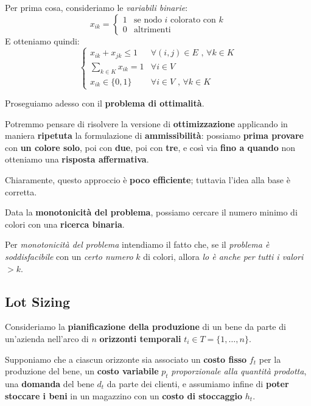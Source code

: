 Per prima cosa, consideriamo le \textit{variabili binarie}:
\[
    x_{ik} = \begin{cases}
    1 & \text{se nodo } i \text{ colorato con } k \\ 
    0 & \text{altrimenti}
    \end{cases}
\]
E otteniamo quindi:
\[
    \begin{cases}
        x_{ik} + x_{jk} \le 1 & \forall (i,j) \in E \text{ , } \forall k \in K \\ 
        \displaystyle\sum_{k\in K} x_{ik} = 1 & \forall i \in V \\ 
        x_{ik} \in \{0,1\} & \forall i \in V \text{ , } \forall k \in K
    \end{cases}
\]

Proseguiamo adesso con il \textbf{problema di ottimalità}.

\begin{remark}
    Potremmo pensare di risolvere la versione di \textbf{ottimizzazione}
    applicando in maniera \textbf{ripetuta} la formulazione di \textbf{ammissibilità}:
    possiamo \textbf{prima provare} con \textbf{un colore solo}, poi con \textbf{due},
    poi con \textbf{tre}, e così via \textbf{fino a quando} non otteniamo una
    \textbf{risposta affermativa}.
\end{remark}

Chiaramente, questo approccio è \textbf{poco efficiente}; tuttavia l'idea
alla base è corretta.

\begin{remark}
    Data la \textbf{monotonicità del problema}, possiamo cercare il numero minimo 
    di colori con una \textbf{ricerca binaria}.
\end{remark}

Per \textit{monotonicità del problema} intendiamo il fatto che, se il 
\textit{problema è soddisfacibile} con un \textit{certo numero} $k$ di colori, 
allora \textit{lo è anche per tutti i valori} $>k$.

\subsection{Lot Sizing}

Consideriamo la \textbf{pianificazione della produzione} di un bene da parte di un'azienda
nell'arco di $n$ \textbf{orizzonti temporali} $t_i \in T= \{ 1,\ldots ,n \}$.

Supponiamo che a ciascun orizzonte sia associato un \textbf{costo fisso} $f_t$ per la 
produzione del bene, un \textbf{costo variabile} $p_t$ \textit{proporzionale alla quantità prodotta}, 
una \textbf{domanda} del bene $d_t$ da parte dei clienti, e assumiamo infine di 
\textbf{poter stoccare i beni} in un magazzino con un \textbf{costo di stoccaggio} $h_t$.

